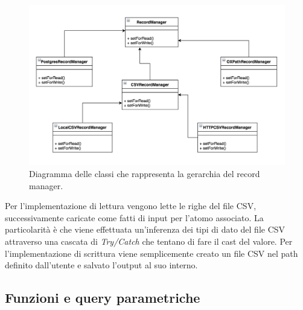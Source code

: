\begin{figure}[h]
	\centering
	\includegraphics[width=0.8\linewidth]{figure/recordmanageruml}
	\caption{Diagramma delle classi che rappresenta la gerarchia del record manager.}
	\label{fig:recordmanageruml}
\end{figure}

Per l'implementazione di lettura vengono lette le righe del file CSV, successivamente caricate come fatti di input per l'atomo associato. La particolarità è che viene effettuata un'inferenza dei tipi di dato del file CSV attraverso una cascata di \emph{Try/Catch} che tentano di fare il cast del valore. \newline
Per l'implementazione di scrittura viene semplicemente creato un file CSV nel path definito dall'utente e salvato l'output al suo interno.

\subsection{Funzioni e query parametriche}

